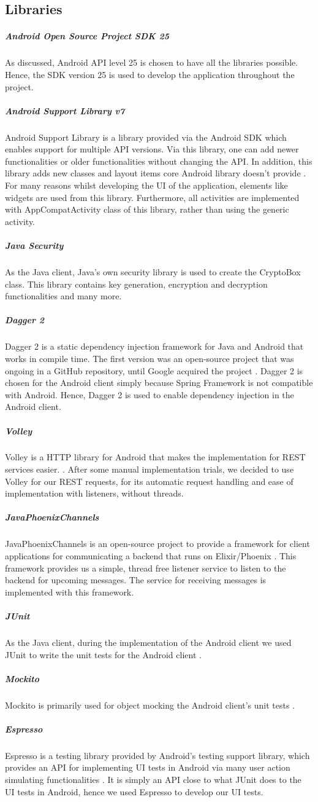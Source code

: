 \documentclass[11pt,a4paper]{report}
\begin{document}
\subsection{Libraries}
\subparagraph{Android Open Source Project SDK 25}
As discussed, Android API level 25 is chosen to have all the libraries possible. Hence, the SDK version 25 is used to develop the application throughout the project.
\subparagraph{Android Support Library v7}
Android Support Library is a library provided via the Android SDK which enables support for multiple API versions. Via this library, one can add newer functionalities or older functionalities without changing the API. In addition, this library adds new classes and layout items core Android library doesn’t provide \cite{website:android_support_library}. For many reasons whilst developing the UI of the application, elements like widgets are used from this library. Furthermore, all activities are implemented with AppCompatActivity class of this library, rather than using the generic activity.
\subparagraph{Java Security}
As the Java client, Java’s own security library is used to create the CryptoBox class. This library contains key generation, encryption and decryption functionalities and many more.
\subparagraph{Dagger 2}
Dagger 2 is a static dependency injection framework for Java and Android that works in compile time. The first version was an open-source project that was ongoing in a GitHub repository, until Google acquired the project \cite{website:dagger_homepage}. Dagger 2 is chosen for the Android client simply because Spring Framework is not compatible with Android. Hence, Dagger 2 is used to enable dependency injection in the Android client.
\subparagraph{Volley}
Volley is a HTTP library for Android that makes the implementation for REST services easier. \cite{website:volley_homepage}. After some manual implementation trials, we decided to use Volley for our REST requests, for its automatic request handling and ease of implementation with listeners, without threads.
\subparagraph{JavaPhoenixChannels}
JavaPhoenixChannels is an open-source project to provide a framework for client applications for communicating a backend that runs on Elixir/Phoenix \cite{website:java_phoenix_channels_homepage}. This framework provides us a simple, thread free listener service to listen to the backend for upcoming messages. The service for receiving messages is implemented with this framework.
\subparagraph{JUnit}
As the Java client, during the implementation of the Android client we used JUnit to write the unit tests for the Android client \cite{website:junit_homepage}.
\subparagraph{Mockito}
Mockito is primarily used for object mocking the Android client’s unit tests \cite {website:mockito_homepage}.
\subparagraph{Espresso}
Espresso is a testing library provided by Android’s testing support library, which provides an API for implementing UI tests in Android via many user action simulating functionalities \cite{website:espresso_homepage}. It is simply an API close to what JUnit does to the UI tests in Android, hence we used Espresso to develop our UI tests.
\end{document}
